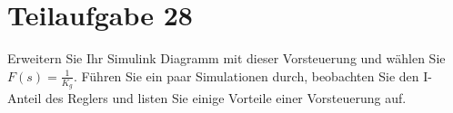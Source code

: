 \section{Teilaufgabe 28}
\begin{aufgabe}
Erweitern Sie Ihr Simulink Diagramm mit dieser Vorsteuerung und wählen Sie 
$F(s) = \frac{1}{K_g}$. Führen Sie ein paar Simulationen durch, beobachten Sie 
den I-Anteil des Reglers und listen Sie einige Vorteile einer Vorsteuerung auf.
\end{aufgabe}
